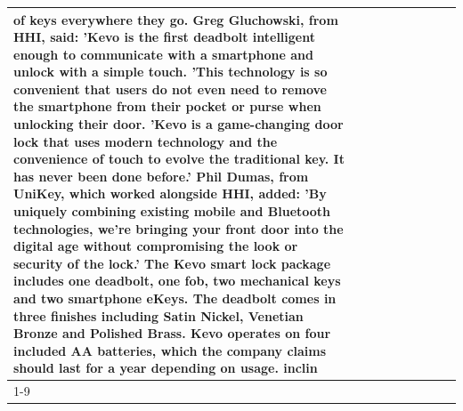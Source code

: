 \begin{table}[H]
\begin{tabular}{lllrlllll}
of keys everywhere they go. Greg Gluchowski, from HHI, said: 'Kevo is the first deadbolt intelligent enough to communicate with a smartphone and unlock with a simple touch. 'This technology is so convenient that users do not even need to remove the smartphone from their pocket or purse when unlocking their door. 'Kevo is a game-changing door lock that uses modern technology and the convenience of touch to evolve the traditional key. It has never been done before.' Phil Dumas, from UniKey, which worked alongside HHI, added: 'By uniquely combining existing mobile and Bluetooth technologies, we’re bringing your front door into the digital age without compromising the look or security of the lock.' The Kevo smart lock package includes one deadbolt, one fob, two mechanical keys and two smartphone eKeys. The deadbolt comes in three finishes including Satin Nickel, Venetian Bronze and Polished Brass. Kevo operates on four included AA batteries, which the company claims should last for a year depending on usage. inclin \\
\cline{1-9}

\end{tabular}
\end{table}
